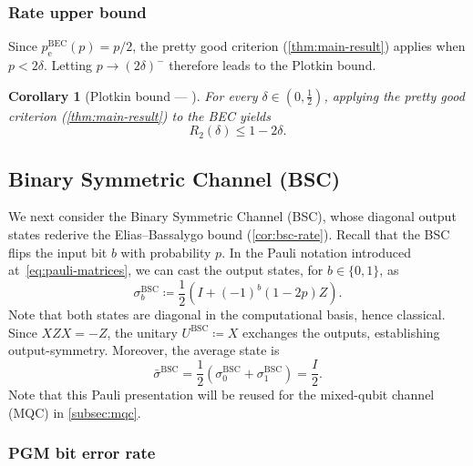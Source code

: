 \documentclass[11pt]{article}
\renewcommand{\leq}{\leqslant}
\newtheorem{corollary}[corollary]{Corollary}
\theoremstyle{remark}
\newcommand{\bits}{\{0,1\}}
\newcommand{\BEC}{\mathrm{BEC}}
\newcommand{\BSC}{\mathrm{BSC}}
\begin{document}
\subsubsection{Rate upper bound}
\label{subsubsec:bec-rate}

Since $p_{\mathrm{e}}^{\BEC}(p) = p/2$, the pretty good criterion (\cref{thm:main-result}) applies when $p < 2\delta$.
Letting $p \to (2\delta)^-$ therefore leads to the Plotkin bound.

\begin{corollary}[{Plotkin bound --- \cite[pp.~445--450]{Plo60}}]
\label{cor:bec-rate}
For every $\delta \in (0,\frac{1}{2})$, applying the pretty good criterion (\cref{thm:main-result}) to the BEC yields
\begin{equation*}
R_2(\delta) \leq 1-2\delta.
\end{equation*}
\end{corollary}

\subsection{Binary Symmetric Channel (BSC)}
\label{subsec:bsc}

We next consider the Binary Symmetric Channel (BSC), whose diagonal output states rederive the Elias--Bassalygo bound (\cref{cor:bsc-rate}). Recall that the BSC flips the input bit $b$ with probability $p$. In the Pauli notation introduced at~\eqref{eq:pauli-matrices}, we can cast the output states, for $b \in \bits$, as
\begin{equation}
 \label{eq:bsc-pauli-form}
\sigma_b^{\BSC} \coloneqq \frac{1}{2}\left(I+(-1)^b(1-2p)Z\right).
\end{equation}
Note that both states are diagonal in the computational basis, hence classical. Since $XZX = -Z$, the unitary $U^{\BSC} \coloneqq X$ exchanges the outputs, establishing output-symmetry. Moreover, the average state is
\begin{equation*}
\bar{\sigma}^{\BSC}
= \frac{1}{2}\left(\sigma_0^{\BSC}+\sigma_1^{\BSC}\right)
= \frac{I}{2}.
\end{equation*}
Note that this Pauli presentation will be reused for the mixed-qubit channel (MQC) in \cref{subsec:mqc}.

\subsubsection{PGM bit error rate}
\label{subsubsec:bsc-pgm-error}
\end{document}
